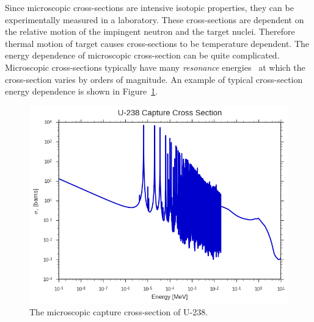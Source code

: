 Since microscopic cross-sections are intensive isotopic properties, they can be experimentally measured in a laboratory. These cross-sections are dependent on the relative motion of the impingent neutron and the target nuclei. Therefore thermal motion of target causes cross-sections to be temperature dependent. The energy dependence of microscopic cross-section can be quite complicated. Microscopic cross-sections typically have many \textit{resonance} energies~\cite{compound-nucleus, bell1970nuclear} at which the cross-section varies by orders of magnitude. An example of typical cross-section energy dependence is shown in Figure~\ref{fig:microscopic-xs}.
\begin{figure}[h!]
	\centering
	\includegraphics[width=0.9\linewidth]{figures/u238-capture-xs.png}
	\caption[]{The microscopic capture cross-section of U-238.}
	\label{fig:microscopic-xs}
\end{figure}

